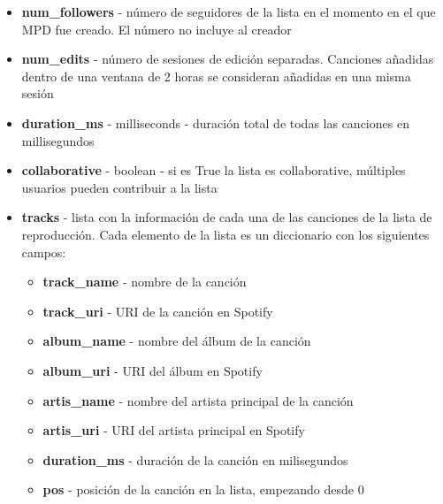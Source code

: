\documentclass{article}
\begin{document}
\begin{itemize}
\begin{itemize}
			\item \textbf{num\_followers} - número de seguidores de la lista en el momento en el que MPD fue creado. El número no incluye al creador
			\item \textbf{num\_edits} - número de sesiones de edición separadas. Canciones añadidas dentro de una ventana de 2 horas se consideran añadidas en una misma sesión
			\item \textbf{duration\_ms} - milliseconds - duración total de todas las canciones en millisegundos
			\item \textbf{collaborative} - boolean - si es True la lista es collaborative, múltiples usuarios pueden contribuir a la lista
			\item \textbf{tracks} - lista con la información de cada una de las canciones de la lista de reproducción. Cada elemento de la lista es un diccionario con los siguientes campos:
			\begin{itemize}
				\item \textbf{track\_name} - nombre de la canción
				\item \textbf{track\_uri} - URI de la canción en Spotify
				\item \textbf{album\_name} - nombre del álbum de la canción
				\item \textbf{album\_uri} - URI del álbum en Spotify
				\item \textbf{artis\_name} - nombre del artista principal de la canción
				\item \textbf{artis\_uri} - URI del artista principal en Spotify
				\item \textbf{duration\_ms} - duración de la canción en milisegundos
				\item \textbf{pos} - posición de la canción en la lista, empezando desde 0
			\end{itemize}	
		\end{itemize}
	\end{itemize}
\end{document}
